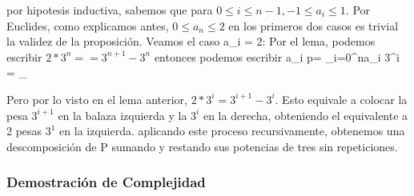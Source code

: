 \documentclass[spanish,12pt]{article}
\begin{document}
por hipotesis inductiva, sabemos que para $0\leq i \leq n-1, -1\leq a_{i}\leq 1$. Por Euclides, como explicamos antes, $0\leq a_{n} \leq 2 $ en los primeros dos casos es trivial la validez de la proposición. 
Veamos el caso a_{i} = 2:
  Por el lema, podemos escribir $2*3^{n}= = 3^{n+1}-3^{n}$  entonces  podemos escribir a_{i} p= \sum_{i=0}^{n}{a_i 3^{i}} = \sum_{ 


 Pero por lo visto en el lema anterior, $2*3^{i}= 3^{i+1}-3^{i}$. Esto equivale a colocar la pesa $3^{i+1}$ en la balaza izquierda y la $3^{i}$ en la derecha, obteniendo el equivalente a 2 pesas $3^{1}$ en la izquierda. aplicando este proceso recursivamente, obtenemos  una descomposición de P sumando y restando sus potencias de tres sin repeticiones.


\subsubsection{Demostración de Complejidad}

}
\end{document}
